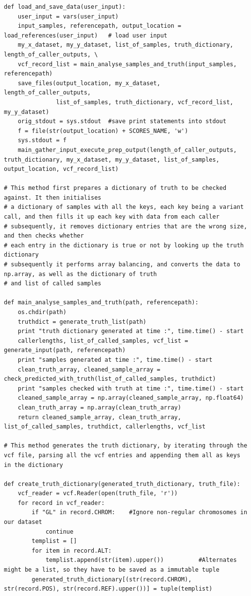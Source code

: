 \documentclass{article}
\begin{document}
\begin{verbatim}
def load_and_save_data(user_input):
    user_input = vars(user_input)   
    input_samples, referencepath, output_location = load_references(user_input)   # load user input
    my_x_dataset, my_y_dataset, list_of_samples, truth_dictionary, length_of_caller_outputs, \
    vcf_record_list = main_analyse_samples_and_truth(input_samples, referencepath) 
    save_files(output_location, my_x_dataset, length_of_caller_outputs,
               list_of_samples, truth_dictionary, vcf_record_list, my_y_dataset) 
    orig_stdout = sys.stdout  #save print statements into stdout
    f = file(str(output_location) + SCORES_NAME, 'w')
    sys.stdout = f
    main_gather_input_execute_prep_output(length_of_caller_outputs, truth_dictionary, my_x_dataset, my_y_dataset, list_of_samples, output_location, vcf_record_list) 

# This method first prepares a dictionary of truth to be checked against. It then initialises
# a dictionary of samples with all the keys, each key being a variant call, and then fills it up each key with data from each caller
# subsequently, it removes dictionary entries that are the wrong size, and then checks whether
# each entry in the dictionary is true or not by looking up the truth dictionary
# subsequently it performs array balancing, and converts the data to np.array, as well as the dictionary of truth
# and list of called samples

def main_analyse_samples_and_truth(path, referencepath):
    os.chdir(path)
    truthdict = generate_truth_list(path)       
    print "truth dictionary generated at time :", time.time() - start
    callerlengths, list_of_called_samples, vcf_list = generate_input(path, referencepath)
    print "samples generated at time :", time.time() - start
    clean_truth_array, cleaned_sample_array = check_predicted_with_truth(list_of_called_samples, truthdict)
    print "samples checked with truth at time :", time.time() - start
    cleaned_sample_array = np.array(cleaned_sample_array, np.float64)
    clean_truth_array = np.array(clean_truth_array)
    return cleaned_sample_array, clean_truth_array, list_of_called_samples, truthdict, callerlengths, vcf_list

# This method generates the truth dictionary, by iterating through the vcf file, parsing all the vcf entries and appending them all as keys in the dictionary 

def create_truth_dictionary(generated_truth_dictionary, truth_file):
    vcf_reader = vcf.Reader(open(truth_file, 'r'))    
    for record in vcf_reader:
        if "GL" in record.CHROM:    #Ignore non-regular chromosomes in our dataset
            continue
        templist = []
        for item in record.ALT:
            templist.append(str(item).upper())          #Alternates might be a list, so they have to be saved as a immutable tuple
        generated_truth_dictionary[(str(record.CHROM), str(record.POS), str(record.REF).upper())] = tuple(templist)


\end{verbatim}
\end{document}
